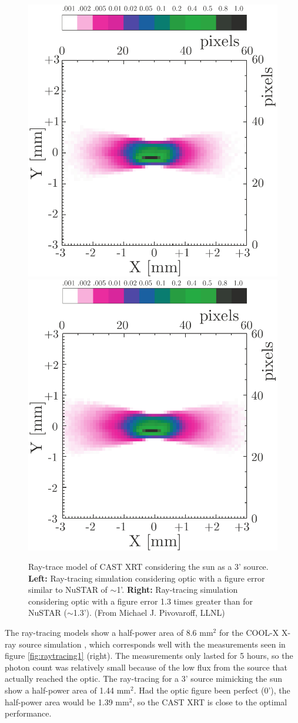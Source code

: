 \begin{figure}[htbp]
  \centering
    \includegraphics[width=0.47\linewidth]{figures/cast/sunspot10.pdf}
    \includegraphics[width=0.47\linewidth]{figures/cast/sunspot13.pdf}
  \caption{\footnotesize Ray-trace model of CAST XRT considering the sun as a 3' source.  \textbf{Left:} Ray-tracing simulation considering optic with a figure error similar to NuSTAR of $\sim$1'.  \textbf{Right:} Ray-tracing simulation considering optic with a figure error 1.3 times greater than for NuSTAR ($\sim$1.3'). (From Michael J. Pivovaroff, LLNL) }
  \label{fig:raytracing2}
\end{figure}

The ray-tracing models show a half-power area of 8.6 mm$^2$ for the COOL-X X-ray source simulation , which corresponds well with the measurements seen in figure \ref{fig:raytracing1} (right). The measurements only lasted for 5 hours, so the photon count was relatively small because of the low flux from the source that actually reached the optic. The ray-tracing for a 3' source mimicking the sun show a half-power area of 1.44 mm$^2$. Had the optic figure been perfect (0'), the half-power area would be 1.39 mm$^2$, so the CAST XRT is close to the optimal performance.

